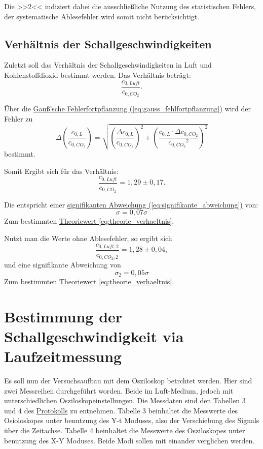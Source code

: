 Die >>2<< indiziert dabei die ausschließliche Nutzung des statistischen Fehlers, der systematische Ablesefehler wird somit nicht berücksichtigt.

\subsection{Verhältnis der Schallgeschwindigkeiten}
Zuletzt soll das Verhältnis der Schallgeschwindigkeiten in Luft und Kohlenstoffdioxid bestimmt werden. Das Verhältnis beträgt: 
\begin{equation}
\frac{c_{0,Luft}}{c_{0,CO_2}}.
\end{equation}

Über die \hyperref[eq:gauss_fehlfortpflanzung]{Gauß'sche Fehlerfortpflanzung (\ref*{eq:gauss_fehlfortpflanzung})} wird der Fehler zu
\begin{equation}
    \Delta \left(\frac{c_{0,L}}{c_{0,CO_2}}\right) = \sqrt{\left(\frac{\Delta c_{0,L}}{c_{0,CO_2}}\right)^2 + \left(\frac{c_{0,L} \cdot \Delta c_{0,CO_2}}{{c_{0,CO_2}}^2}\right)^2}
\end{equation}
bestimmt.

Somit Ergibt sich für das Verhältnis:
\begin{equation}
    \boxed{
        \frac{c_{0,Luft}}{c_{0,CO_2}} = 1,29 \pm 0,17
    }.
\end{equation}

Die entspricht einer \hyperref[eq:signifikante_abweichung]{signifikanten Abweichung (\ref*{eq:signifikante_abweichung})} von:
\begin{equation}
    \sigma = 0,07\sigma
\end{equation}
Zum bestimmten \hyperref[eq:theorie_verhaeltnis]{Theoriewert \ref*{eq:theorie_verhaeltnis}}.

Nutzt man die Werte ohne Ablesefehler, so ergibt sich
\begin{equation}
    {
        \frac{c_{0,Luft,2}}{c_{0,CO_2,2}} = 1,28 \pm 0,04
    },
\end{equation}
und eine signifikante Abweichung von
\begin{equation}
    \sigma_2 = 0,05\sigma
\end{equation}
Zum bestimmten \hyperref[eq:theorie_verhaeltnis]{Theoriewert \ref*{eq:theorie_verhaeltnis}}.

\section{Bestimmung der Schallgeschwindigkeit via Laufzeitmessung}
Es soll nun der Versuchsaufbau mit dem Osziloskop betrchtet werden. Hier sind zwei Messreihen durchgeführt worden. Beide im Luft-Medium, jedoch mit unterschiedlichen Osziloskopeinstellungen. Die Messdaten sind den Tabellen 3 und 4 des \hyperref[Protokoll]{Protokolls} zu entnehmen. Tabelle 3 beinhaltet die Messwerte des Osioloskopes unter benutzung des Y-t Moduses, also der Verschiebung des Signals über die Zeitachse. Tabelle 4 beinhaltet die Messwerte des Osziloskopes unter benutzung des X-Y Moduses.
Beide Modi sollen mit einander verglichen werden.

